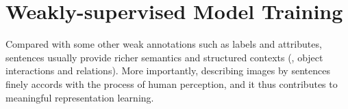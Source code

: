 \documentclass[10pt,twocolumn,letterpaper]{article}
\begin{document}






















\section{Weakly-supervised Model Training}

Compared with some other weak annotations such as labels and attributes, sentences usually provide richer semantics and structured contexts (\eg, object interactions and relations). More importantly, describing images by sentences finely accords with the process of human perception, and it thus contributes to meaningful representation learning.
\end{document}
